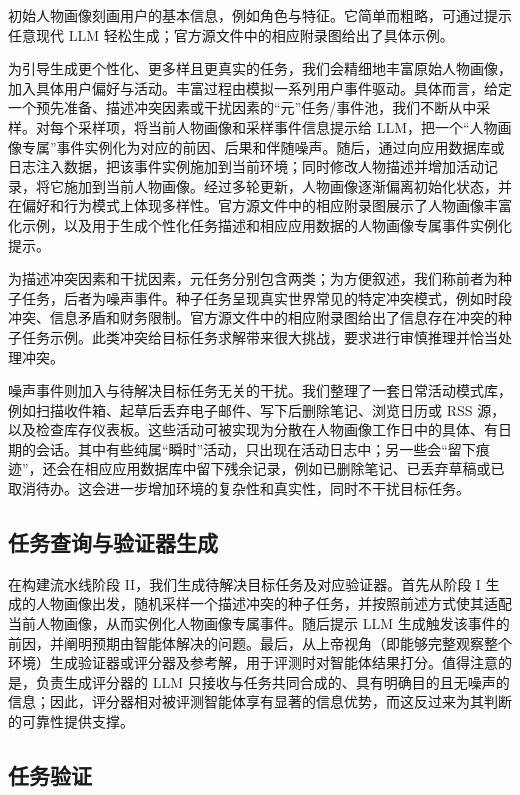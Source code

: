 \documentclass[10pt]{article}
\begin{document}
初始人物画像刻画用户的基本信息，例如角色与特征。它简单而粗略，可通过提示任意现代 LLM 轻松生成；官方源文件中的相应附录图给出了具体示例。

为引导生成更个性化、更多样且更真实的任务，我们会精细地丰富原始人物画像，加入具体用户偏好与活动。丰富过程由模拟一系列用户事件驱动。具体而言，给定一个预先准备、描述冲突因素或干扰因素的“元”任务/事件池，我们不断从中采样。对每个采样项，将当前人物画像和采样事件信息提示给 LLM，把一个“人物画像专属”事件实例化为对应的前因、后果和伴随噪声。随后，通过向应用数据库或日志注入数据，把该事件实例施加到当前环境；同时修改人物描述并增加活动记录，将它施加到当前人物画像。经过多轮更新，人物画像逐渐偏离初始化状态，并在偏好和行为模式上体现多样性。官方源文件中的相应附录图展示了人物画像丰富化示例，以及用于生成个性化任务描述和相应应用数据的人物画像专属事件实例化提示。

为描述冲突因素和干扰因素，元任务分别包含两类；为方便叙述，我们称前者为种子任务，后者为噪声事件。种子任务呈现真实世界常见的特定冲突模式，例如时段冲突、信息矛盾和财务限制。官方源文件中的相应附录图给出了信息存在冲突的种子任务示例。此类冲突给目标任务求解带来很大挑战，要求进行审慎推理并恰当处理冲突。

噪声事件则加入与待解决目标任务无关的干扰。我们整理了一套日常活动模式库，例如扫描收件箱、起草后丢弃电子邮件、写下后删除笔记、浏览日历或 RSS 源，以及检查库存仪表板。这些活动可被实现为分散在人物画像工作日中的具体、有日期的会话。其中有些纯属“瞬时”活动，只出现在活动日志中；另一些会“留下痕迹”，还会在相应应用数据库中留下残余记录，例如已删除笔记、已丢弃草稿或已取消待办。这会进一步增加环境的复杂性和真实性，同时不干扰目标任务。

\subsection{任务查询与验证器生成}

在构建流水线阶段 II，我们生成待解决目标任务及对应验证器。首先从阶段 I 生成的人物画像出发，随机采样一个描述冲突的种子任务，并按照前述方式使其适配当前人物画像，从而实例化人物画像专属事件。随后提示 LLM 生成触发该事件的前因，并阐明预期由智能体解决的问题。最后，从上帝视角（即能够完整观察整个环境）生成验证器或评分器及参考解，用于评测时对智能体结果打分。值得注意的是，负责生成评分器的 LLM 只接收与任务共同合成的、具有明确目的且无噪声的信息；因此，评分器相对被评测智能体享有显著的信息优势，而这反过来为其判断的可靠性提供支撑。

\subsection{任务验证}
\end{document}
